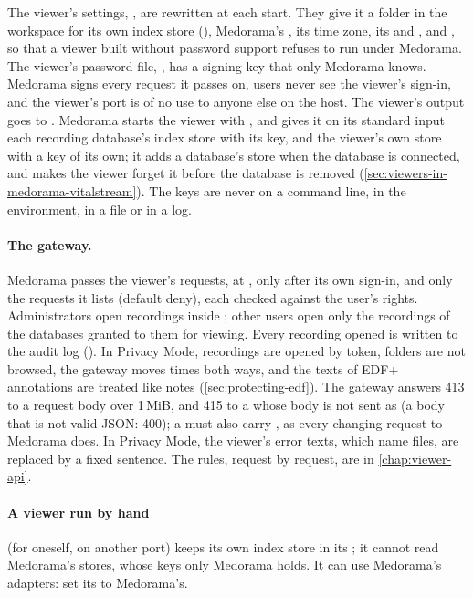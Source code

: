 The viewer's settings, , are rewritten at each start. They
give it a folder in the workspace for its own index store (), Medorama's
, its time zone, its  and , and
, so that a viewer built without password support refuses to run
under Medorama. The viewer's password file, , has a signing key
that only Medorama knows. Medorama signs every request it passes on, users never see the
viewer's sign-in, and the viewer's port is of no use to anyone else on the host. The viewer's
output goes to . Medorama starts the viewer with
, and gives it on its standard input each recording database's index store
with its key, and the viewer's own store with a key of its own; it adds a database's store when
the database is connected, and makes the viewer forget it before the database is removed
(\cref{sec:viewers-in-medorama-vitalstream}). The keys are never on a command line, in the
environment, in a file or in a log.

\paragraph{The gateway.} Medorama passes the viewer's requests, at , only after
its own sign-in, and only the requests it lists (default deny), each checked against the user's
rights. Administrators open recordings inside ; other users open only the
recordings of the databases granted to them for viewing. Every recording opened is written to
the audit log (). In Privacy Mode, recordings are opened by token, folders are not
browsed, the gateway moves times both ways, and the texts of EDF+ annotations are treated like
notes (\cref{sec:protecting-edf}). The gateway answers 413 to a request body over 1\,MiB, and 415
to a  whose body is not sent as  (a body that is not valid
JSON: 400); a  must also carry , as every changing request to
Medorama does. In Privacy Mode, the viewer's error texts, which name files, are replaced by a
fixed sentence. The rules, request by request, are in \cref{chap:viewer-api}.

\paragraph{A viewer run by hand} (for oneself, on another port) keeps its own index store in its
; it cannot read Medorama's stores, whose keys only Medorama holds. It can use
Medorama's adapters: set its  to Medorama's.

